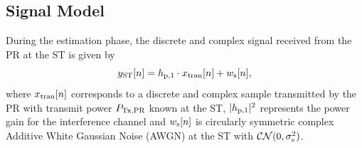 
\subsection{Signal Model}
During the estimation phase, the discrete and complex signal received from the PR at the ST is given by
\begin{equation}
y_{\text{ST}}[n] = h_{\text{p,1}} \cdot x_{\text{tran}}[n] + w_{\text{s}}[n],
\label{eq:sys_mod_st}
\end{equation}
where $x_{\text{tran}}[n]$ corresponds to a discrete and complex sample transmitted by the PR with transmit power $P_{\text{Tx,PR}}$ known at the ST, $|h_{\text{p,1}}|^2$ represents the power gain for the interference channel and $w_{\text{s}}[n]$ is circularly symmetric complex Additive White Gaussian Noise (AWGN) at the ST with %
$\mathcal{CN}(0, \sigma^2_{\text{s}})$. %

